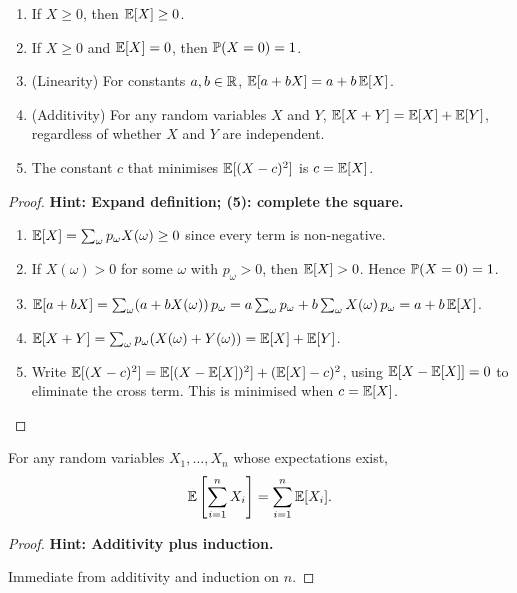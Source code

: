 \documentclass[a4paper]{article}
\begin{document}
\begin{prop}\leavevmode
  \begin{enumerate}
    \item If $X \geq 0$, then $\E[X] \geq 0$.
    \item If $X\geq 0$ and $\E[X] = 0$, then $\P(X = 0) = 1$.
    \item (Linearity) For constants $a, b \in \R$, $\E[a + bX] = a + b\,\E[X]$.
    \item (Additivity) For any random variables $X$ and $Y$, $\E[X + Y] = \E[X] + \E[Y]$, regardless of whether $X$ and $Y$ are independent.
    \item The constant $c$ that minimises $\E[(X - c)^2]$ is $c = \E[X]$.
  \end{enumerate}
\end{prop}

\begin{proof}
  \textbf{Hint: Expand definition; (5): complete the square.}
\leavevmode
  \begin{enumerate}
    \item $\E[X] = \sum_\omega p_\omega X(\omega) \geq 0$ since every term is non-negative.
    \item If $X(\omega) > 0$ for some $\omega$ with $p_\omega > 0$, then $\E[X] > 0$. Hence $\P(X = 0) = 1$.
    \item $\E[a + bX] = \sum_\omega (a + bX(\omega))\,p_\omega = a\sum_\omega p_\omega + b\sum_\omega X(\omega)\,p_\omega = a + b\,\E[X]$.
    \item $\E[X + Y] = \sum_\omega p_\omega(X(\omega) + Y(\omega)) = \E[X] + \E[Y]$.
    \item Write $\E[(X - c)^2] = \E[(X - \E[X])^2] + (\E[X] - c)^2$, using $\E[X - \E[X]] = 0$ to eliminate the cross term. This is minimised when $c = \E[X]$.\qedhere
  \end{enumerate}
\end{proof}

\begin{prop}
  For any random variables $X_1, \dotsc, X_n$ whose expectations exist,
  \[
    \E\left[\sum_{i = 1}^n X_i\right] = \sum_{i = 1}^n \E[X_i].
  \]
\end{prop}

\begin{proof}
  \textbf{Hint: Additivity plus induction.}

  Immediate from additivity and induction on $n$.
\end{proof}
\end{document}
